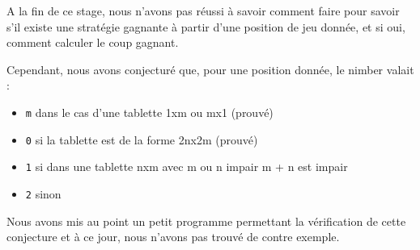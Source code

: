 A la fin de ce stage, nous n'avons pas réussi à savoir comment faire pour savoir s'il existe une stratégie gagnante à partir d'une position de jeu donnée, et si oui, comment calculer le coup gagnant.

Cependant, nous avons conjecturé que, pour une position donnée, le nimber valait :
\begin{itemize}
  \item \texttt{m} dans le cas d'une tablette 1xm ou mx1 (prouvé)
  \item \texttt{0} si la tablette est de la forme 2nx2m (prouvé)
  \item \texttt{1} si dans une tablette nxm avec m ou n impair m + n est impair
  \item \texttt{2} sinon
\end{itemize}
  Nous avons mis au point un petit programme permettant la vérification de cette conjecture et à ce jour, nous n'avons pas trouvé de contre exemple.
